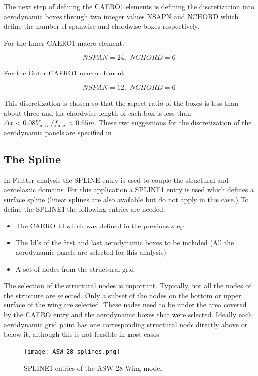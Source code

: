 The next step of defining the CAERO1 elements is defining the
discretization into aerodynamic boxes through two integer values NSAPN
and NCHORD which define the number of spanwise and chordwise boxes
respectively.

For the Inner CAERO1 macro element:

\[NSPAN = 24,\ \ NCHORD = 6\]

For the Outer CAERO1 macro element:

\[NSPAN = 12,\ \ NCHORD = 6\]

This discretization is chosen so that the aspect ratio of the boxes is
less than about three and the chordwise length of each box is less than
\(\Delta x < 0.08V_{\max}\ \text{/}f_{\max} \approx 0.65m\). These two
suggestions for the discretization of the aerodynamic panels are
specified in \cite{msc2021}

\subsection{The Spline}\label{the-spline}

In Flutter analysis the SPLINE entry is used to couple the structural
and aeroelastic domains. For this application a SPLINE1 entry is used
which defines a surface spline (linear splines are also available but do
not apply in this case.) To define the SPLINE1 the following entries are
needed:

\begin{itemize}
\item
  The CAERO Id which was defined in the previous step
\item
  The Id's of the first and last aerodynamic boxes to be included (All
  the aerodynamic panels are selected for this analysis)
\item
  A set of nodes from the structural grid
\end{itemize}

The selection of the structural nodes is important. Typically, not all
the nodes of the structure are selected. Only a subset of the nodes on
the bottom or upper surface of the wing are selected. These nodes need
to be under the area covered by the CAERO entry and the aerodynamic
boxes that were selected. Ideally each aerodynamic grid point has one
corresponding structural node directly above or below it, although this
is not feasible in most cases

\begin{figure}[H]
\centering
\texttt{[image: ASW 28 splines.png]}
\caption{SPLINE1 entries of the ASW 28 Wing model}
\label{fig:SPLINE1}
\end{figure}

